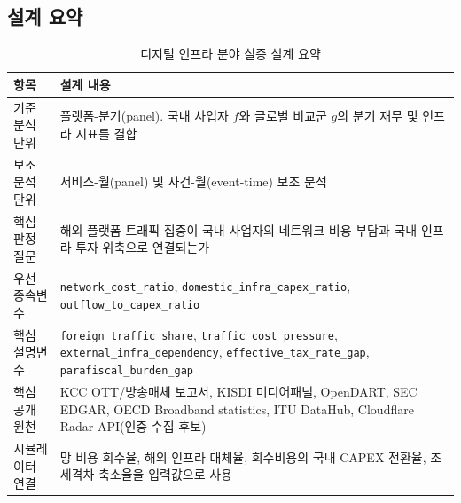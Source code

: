 \documentclass[11pt,a4paper]{report}
\newcommand{\WrapCell}[1]{\parbox[t]{\hsize}{\RaggedRight #1}}
\begin{document}
\subsection{설계 요약}
\begin{table}[H]
  \centering
  \small
  \caption{디지털 인프라 분야 실증 설계 요약}\label{tab:infra_design_summary}
  \begin{tabular}{L{2.4cm}L{10.0cm}}
    \toprule
    항목 & 설계 내용 \\
    \midrule
    기준 분석 단위 & 플랫폼-분기(panel). 국내 사업자 $f$와 글로벌 비교군 $g$의 분기 재무 및 인프라 지표를 결합 \\
    보조 분석 단위 & 서비스-월(panel) 및 사건-월(event-time) 보조 분석 \\
    핵심 판정 질문 & 해외 플랫폼 트래픽 집중이 국내 사업자의 네트워크 비용 부담과 국내 인프라 투자 위축으로 연결되는가 \\
    우선 종속변수 & \WrapCell{\texttt{network\_cost\_ratio}, \nolinkurl{domestic_infra_capex_ratio},\\\texttt{outflow\_to\_capex\_ratio}} \\
    핵심 설명변수 & \WrapCell{\texttt{foreign\_traffic\_share}, \texttt{traffic\_cost\_pressure},\\\texttt{external\_infra\_dependency}, \texttt{effective\_tax\_rate\_gap},\\\texttt{parafiscal\_burden\_gap}} \\
    핵심 공개 원천 & KCC OTT/방송매체 보고서, KISDI 미디어패널, OpenDART, SEC EDGAR, OECD Broadband statistics, ITU DataHub, Cloudflare Radar API(인증 수집 후보) \\
    시뮬레이터 연결 & 망 비용 회수율, 해외 인프라 대체율, 회수비용의 국내 CAPEX 전환율, 조세격차 축소율을 입력값으로 사용 \\
    \bottomrule
  \end{tabular}
\end{table}
\end{document}
